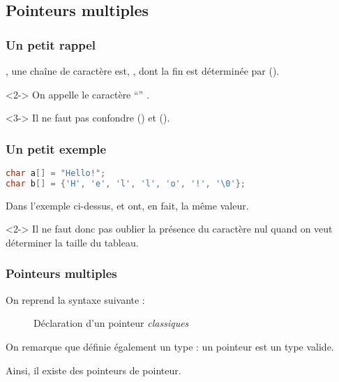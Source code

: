 \documentclass{cppcourses}
\begin{document}
\subsection{Pointeurs multiples}

\begin{frame}

\frametitle{Un petit rappel}

\begin{remark}
, une chaîne de caractère est, ,  dont la fin est déterminée par  ().
\end{remark}

\begin{remark}<2->
On appelle le caractère \enquote{\myimp{\textbackslash}} .
\end{remark}

\begin{warning}<3->
Il ne faut pas confondre  () et  ().
\end{warning}

\end{frame}

\begin{frame}[fragile]

\frametitle{Un petit exemple}

\begin{example}

\begin{lstlisting}[language = c++]
char a[] = "Hello!";
char b[] = {'H', 'e', 'l', 'l', 'o', '!', '\0'};
\end{lstlisting}

Dans l'exemple ci-dessus,  et  ont, en fait, la même valeur.

\end{example}

\begin{warning}<2->
Il ne faut donc pas oublier la présence du caractère nul quand on veut déterminer la taille du tableau.
\end{warning}

\end{frame}

\begin{frame}

\frametitle{Pointeurs multiples}

On reprend la syntaxe suivante :

\begin{figure}
\mykeyword{\textcolor{orange}{<type>}* \textcolor{red}{<identifiant>};}
\caption{Déclaration d'un pointeur \emph{classiques}}
\end{figure}

On remarque que \mykeyword{\textcolor{orange}{<type>}*} définie également un type : un pointeur est un type valide.

Ainsi, il existe des pointeurs de pointeur.

\end{frame}
\end{document}
